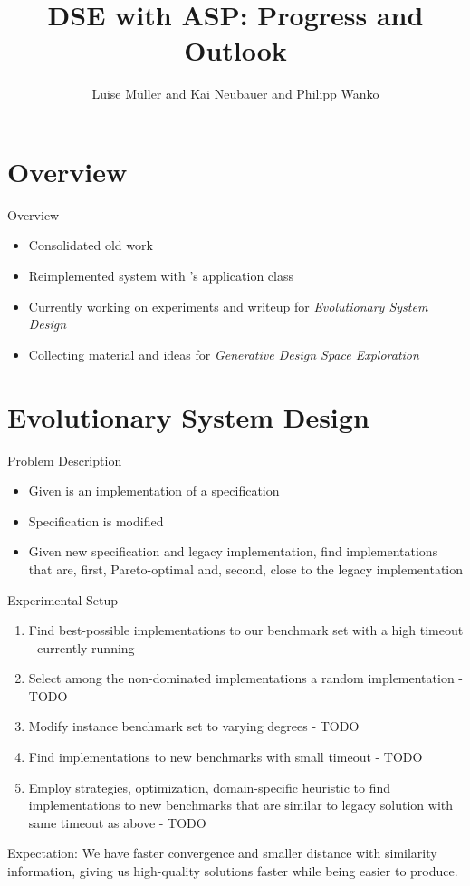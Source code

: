 \documentclass[11pt]{beamer}
\author[Müller et al.]{Luise Müller and Kai Neubauer and Philipp Wanko}
\title[DSE with ASP: Progress and Outlook]{DSE with ASP: Progress and Outlook}
\date{}
\begin{document}



\begin{frame}
\titlepage
\end{frame}

\section{Overview}

\begin{frame}{Overview}
\begin{itemize}
  \item Consolidated old work
  \item Reimplemented system with \clingo's application class
  \pause
  \item Currently working on experiments and writeup for \emph{Evolutionary System Design}
  \pause
  \item Collecting material and ideas for \emph{Generative Design Space Exploration}
\end{itemize}
\end{frame}

\section{Evolutionary System Design}

\begin{frame}{Problem Description}
  \begin{itemize}
    \item Given is an implementation of a specification
    \item Specification is modified
    \item Given new specification and legacy implementation, find implementations that are, first, Pareto-optimal and, second, close to the legacy implementation
  \end{itemize}
\end{frame}

\begin{frame}{Experimental Setup}
  \begin{enumerate}
    \item Find best-possible implementations to our benchmark set with a high timeout - currently running
    \item Select among the non-dominated implementations a random implementation - TODO
    \item Modify instance benchmark set to varying degrees - TODO
    \item Find implementations to new benchmarks with small timeout - TODO
    \item Employ strategies, optimization, domain-specific heuristic to find implementations to new benchmarks that are similar to legacy solution with same timeout as above - TODO
  \end{enumerate}
  \pause
  Expectation: We have faster convergence and smaller distance with similarity information, giving us high-quality solutions faster while being easier to produce.
\end{frame}
\end{document}
